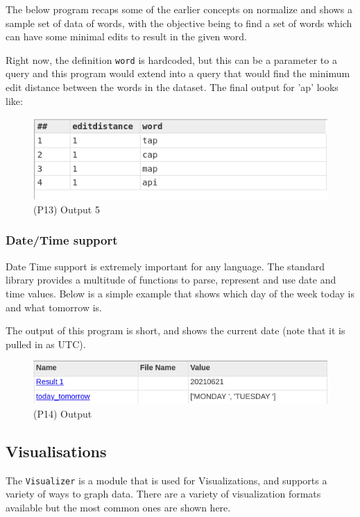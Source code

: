 \documentclass[a4paper,oneside,12pt]{book}
\begin{document}
The below program recaps some of the earlier concepts on normalize and shows a sample set of data of words, with the objective being to find a set of words which can have some minimal edits to result in the given word.

Right now, the definition \lstinline{word} is hardcoded, but this can be a parameter to a query and this program would extend into a query that would find the minimum edit distance between the words in the dataset.
The final output for 'ap' looks like:

\begin{figure}[h]
    \centering
    \includegraphics[width=.6\linewidth]{../output/77/5}
    \caption{(P13) Output 5}
\end{figure}

\subsubsection{Date/Time support}

Date Time support is extremely important for any language. The standard library provides a multitude of functions to parse, represent and use date and time values.
Below is a simple example that shows which day of the week today is and what tomorrow is.




The output of this program is short, and shows the current date (note that it is pulled in as UTC).

\begin{figure}[h]
    \centering
    \includegraphics[width=.6\linewidth]{../output/78/1}
    \caption{(P14) Output}
\end{figure}




\subsection{Visualisations}

The \lstinline!Visualizer! is a module that is used for Visualizations, and supports a variety of ways to graph data. There are a variety of visualization formats available but the most common ones are shown here.
\end{document}

